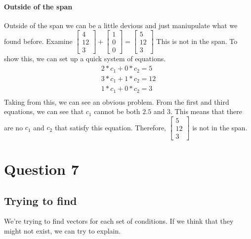\documentclass{article}
\begin{document}
        \paragraph{Outside of the span}
            Outside of the span we can be a little devious and just maniupulate what we found before.
            Examine
            $
            \begin{bmatrix}
            4 \\ 12 \\ 3 
            \end{bmatrix}
            +
            \begin{bmatrix}
            1 \\ 0 \\ 0
            \end{bmatrix}
            =
            \begin{bmatrix}
            5 \\ 12 \\ 3
            \end{bmatrix}
            $
            This is not in the span. To show this, we can set up a quick system of equations.
            \[
            \begin{array}{c}
            2*c_1 + 0*c_2 = 5 \\
            3*c_1 + 1*c_2 = 12 \\
            1*c_1 + 0*c_2 = 3 \\
            \end{array}
            \]
            Taking from this, we can see an obvious problem.
            From the first and third equations, we can see that $c_1$ cannot be both $2.5$ and $3$.
            This means that there are no $c_1$ and $c_2$ that satisfy this equation.
            Therefore, $\begin{bmatrix}5 \\ 12 \\ 3\end{bmatrix}$ is not in the span.





    \section{Question 7}
            \subsection{Trying to find}
                We're trying to find vectors for each set of conditions.
                If we think that they might not exist, we can try to explain.
\end{document}

